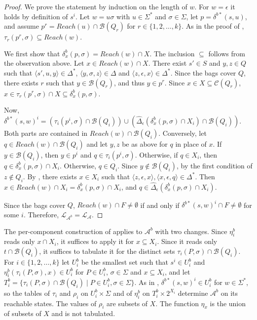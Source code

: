 \begin{proof}
  We prove the statement by induction on the length of $w$. For $w = \epsilon$ it holds by
  definition of $s^i$. Let $w = u\sigma$ with $u \in \Sigma^*$ and $\sigma \in \Sigma$, let
  $p = \delta^{b*}(s, u)$, and assume $p^r = Reach(u) \cap \mathcal{B}(Q_r)$ for $r \in \{ 1,
  2, \ldots, k \}$. As in the proof of , $\tau_r(p^r, \sigma)
  \subseteq Reach(w)$.

  We first show that $\delta_x^b(p, \sigma) = Reach(w) \cap X$. The inclusion $\subseteq$
  follows from the observation above. Let $x \in Reach(w) \cap X$. There exist $s' \in S$
  and $y, z \in Q$ such that $\langle s', u, y \rangle \in \Delta^*$, $\langle y, \sigma, z
  \rangle \in \Delta$ and $\langle z, \epsilon, x \rangle \in \Delta^*$. Since the bags cover
  $Q$, there exists $r$ such that $y \in \mathcal{B}(Q_r)$, and thus $y \in p^r$. Since $x
  \in X \subseteq \mathcal{C}(Q_r)$, $x \in \tau_r(p^r, \sigma) \cap X \subseteq
  \delta_x^b(p, \sigma)$.

  Now, $\delta^{b*}(s, w)^i = (\tau_i(p^i, \sigma) \cap \mathcal{B}(Q_i)) \cup
  (\hat{\Delta}_\epsilon(\delta_x^b(p, \sigma) \cap X_i) \cap \mathcal{B}(Q_i))$. Both parts
  are contained in $Reach(w) \cap \mathcal{B}(Q_i)$. Conversely, let $q \in Reach(w) \cap
  \mathcal{B}(Q_i)$ and let $y, z$ be as above for $q$ in place of $x$. If $y \in
  \mathcal{B}(Q_i)$, then $y \in p^i$ and $q \in \tau_i(p^i, \sigma)$. Otherwise, if $q \in
  X_i$, then $q \in \delta_x^b(p, \sigma) \cap X_i$. Otherwise, $q \in Q_i$. Since $y
  \not\in \mathcal{B}(Q_i)$, by the first condition of  $z \not\in Q_i$.
  By , there exists $x \in X_i$ such that $\langle z, \epsilon, x
  \rangle, \langle x, \epsilon, q \rangle \in \Delta^*$. Then $x \in Reach(w) \cap X_i =
  \delta_x^b(p, \sigma) \cap X_i$, and $q \in \hat{\Delta}_\epsilon(\delta_x^b(p, \sigma) \cap
  X_i)$.

  Since the bags cover $Q$, $Reach(w) \cap F \neq \emptyset$ if and only if
  $\delta^{b*}(s, w)^i \cap F \neq \emptyset$ for some $i$. Therefore,
  $\mathcal{L}_{\mathcal{A}^b} = \mathcal{L}_\mathcal{A}$.
\end{proof}

The per-component construction of  applies to
$\mathcal{A}^b$ with two changes. Since $\eta_i^b$ reads only $x \cap X_i$, it suffices to
apply it for $x \subseteq X_i$. Since it reads only $t \cap \mathcal{B}(Q_i)$, it suffices to
tabulate it for the distinct sets $\tau_i(P, \sigma) \cap \mathcal{B}(Q_i)$. For $i \in \{ 1,
2, \ldots, k \}$ let $U_i^b$ be the smallest set such that $s^i \in U_i^b$ and
$\eta_i^b(\tau_i(P, \sigma), x) \in U_i^b$ for $P \in U_i^b$, $\sigma \in \Sigma$ and $x
\subseteq X_i$, and let $T_i^b = \{ \tau_i(P, \sigma) \cap \mathcal{B}(Q_i) \mid P \in U_i^b,
\sigma \in \Sigma \}$. As in , $\delta^{b*}(s, w)^i \in U_i^b$
for $w \in \Sigma^*$, so the tables of $\tau_i$ and $\rho_i$ on $U_i^b \times \Sigma$ and of
$\eta_i^b$ on $T_i^b \times 2^{X_i}$ determine $\mathcal{A}^b$ on its reachable states. The
values of $\rho_i$ are subsets of $X$. The function $\eta_x$ is the union of subsets of $X$
and is not tabulated.

